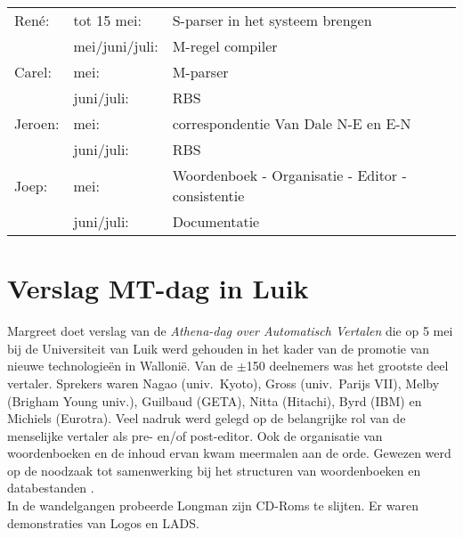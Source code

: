 \begin{enumerate}
\begin{tabular}{lll}
  Ren\'{e}: & tot 15 mei: & S-parser in het systeem brengen\\
            & mei/juni/juli: & M-regel compiler\\
  Carel: & mei: & M-parser\\
         & juni/juli: & RBS\\
  Jeroen: & mei: & correspondentie Van Dale N-E en E-N\\
          & juni/juli: & RBS\\
  Joep:  & mei: & Woordenboek - Organisatie - Editor - consistentie\\
         & juni/juli: & Documentatie\\
  \end{tabular}

\end{enumerate}

\section {Verslag MT-dag in Luik}
Margreet doet verslag van de {\em Athena-dag over Automatisch Vertalen} die op 
5 mei bij de Universiteit van Luik werd gehouden in het kader van de promotie 
van nieuwe technologie\"{e}n in Walloni\"{e}. Van de $\pm$150 deelnemers was het 
grootste deel vertaler. Sprekers waren Nagao (univ.\ Kyoto), Gross (univ.\ 
Parijs VII), Melby (Brigham Young univ.), Guilbaud (GETA),
Nitta (Hitachi), Byrd (IBM) en Michiels (Eurotra). Veel nadruk werd gelegd op de
belangrijke rol van de menselijke vertaler als pre- en/of post-editor. Ook de
organisatie van woordenboeken en de inhoud ervan kwam meermalen aan de orde.
Gewezen werd op de noodzaak tot samenwerking bij het structuren van
woordenboeken en databestanden . \\
In de wandelgangen probeerde Longman zijn CD-Roms te slijten. Er waren 
demonstraties van Logos en LADS.

